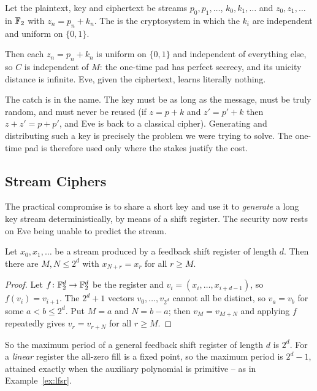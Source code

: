 \documentclass[a4paper]{scrartcl}
\begin{document}
\begin{definition}
	Let the plaintext, key and ciphertext be streams $p_0,p_1,\dots$, $k_0,k_1,\dots$ and $z_0,z_1,\dots$ in $\mathbb{F}_2$ with $z_n = p_n+k_n$. The  is the cryptosystem in which the $k_i$ are independent and uniform on $\{0,1\}$.
\end{definition}

Then each $z_n = p_n + k_n$ is uniform on $\{0,1\}$ and independent of everything else, so $C$ is independent of $M$: the one-time pad has perfect secrecy, and its unicity distance is infinite. Eve, given the ciphertext, learns literally nothing.

The catch is in the name. The key must be as long as the message, must be truly random, and must never be reused (if $z = p+k$ and $z' = p'+k$ then $z + z' = p+p'$, and Eve is back to a classical cipher). Generating and distributing such a key is precisely the problem we were trying to solve. The one-time pad is therefore used only where the stakes justify the cost.

\subsection{Stream Ciphers}

The practical compromise is to share a short key and use it to \emph{generate} a long key stream deterministically, by means of a shift register. The security now rests on Eve being unable to predict the stream.

\begin{lemma}\label{lem:period}
	Let $x_0,x_1,\dots$ be a stream produced by a feedback shift register of length $d$. Then there are $M,N\le2^d$ with $x_{N+r}=x_r$ for all $r \ge M$.
\end{lemma}

\begin{proof}
	Let $f\colon\mathbb{F}_2^d\to\mathbb{F}_2^d$ be the register and $v_i = (x_i,\dots,x_{i+d-1})$, so $f(v_i)=v_{i+1}$. The $2^d+1$ vectors $v_0,\dots,v_{2^d}$ cannot all be distinct, so $v_a=v_b$ for some $a<b\le2^d$. Put $M = a$ and $N = b-a$; then $v_M = v_{M+N}$ and applying $f$ repeatedly gives $v_r = v_{r+N}$ for all $r \ge M$.
\end{proof}

\begin{remark}
	So the maximum period of a general feedback shift register of length $d$ is $2^d$. For a \emph{linear} register the all-zero fill is a fixed point, so the maximum period is $2^d-1$, attained exactly when the auxiliary polynomial is primitive -- as in Example~\ref{ex:lfsr}.
\end{remark}
\end{document}
